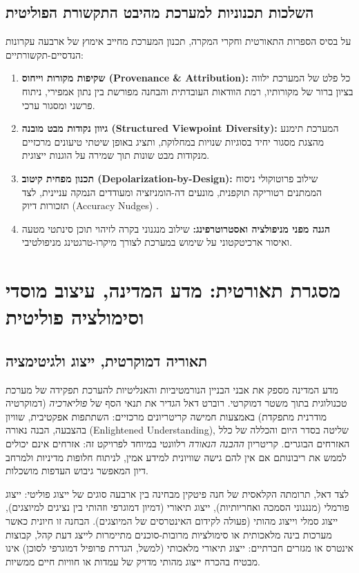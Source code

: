 \subsection{השלכות תכנוניות למערכת מהיבט התקשורת הפוליטית}
על בסיס הספרות התאורטית וחקרי המקרה, תכנון המערכת מחייב אימוץ של ארבעה עקרונות הנדסיים-תקשורתיים:
\begin{enumerate}
    \item \textbf{שקיפות מקורות וייחוס (Provenance \& Attribution):} כל פלט של המערכת ילווה בציון ברור של מקורותיו, רמת הוודאות העובדתית והבחנה מפורשת בין נתון אמפירי, ניתוח פרשני ומסגור ערכי.
    \item \textbf{גיוון נקודות מבט מובנה (Structured Viewpoint Diversity):} המערכת תימנע מהצגת מסגור יחיד בסוגיות שנויות במחלוקת, ותציג באופן שיטתי טיעונים מרכזיים מנקודות מבט שונות תוך שמירה על הוגנות ייצוגית.
    \item \textbf{תכנון מפחית קיטוב (Depolarization-by-Design):} שילוב פרוטוקולי ניסוח הממתנים רטוריקה תוקפנית, מונעים דה-הומניזציה ומעודדים הנמקה עניינית, לצד תזכורות דיוק (Accuracy Nudges) \cite{pennycook2021shifting}.
    \item \textbf{הגנה מפני מניפולציה ואסטרוטרפינג:} שילוב מנגנוני בקרה לזיהוי תוכן סינתטי מטעה ואיסור ארכיטקטוני על שימוש במערכת לצורך מיקרו-טרגטינג מניפולטיבי.
\end{enumerate}

\section{מסגרת תאורטית: מדע המדינה, עיצוב מוסדי וסימולציה פוליטית}
\label{sec:political-science}

\subsection{תאוריה דמוקרטית, ייצוג ולגיטימציה}
מדע המדינה מספק את אבני הבניין הנורמטיביות והאנליטיות להערכת תפקידה של מערכת טכנולוגית בתוך משטר דמוקרטי. רוברט דאל \cite{dahl1989democracy} הגדיר את תנאי הסף של \emph{פוליארכיה} (דמוקרטיה מודרנית מתפקדת) באמצעות חמישה קריטריונים מרכזיים: השתתפות אפקטיבית, שוויון בהצבעה, הבנה נאורה (Enlightened Understanding), שליטה בסדר היום והכללה של כלל האזרחים הבוגרים. קריטריון \emph{ההבנה הנאורה} רלוונטי במיוחד לפרויקט זה: אזרחים אינם יכולים לממש את ריבונותם אם אין להם גישה שוויונית למידע אמין, לניתוח חלופות מדיניות ולמרחב דיון המאפשר גיבוש העדפות מושכלות.

לצד דאל, תרומתה הקלאסית של חנה פיטקין \cite{pitkin1967concept} מבחינה בין ארבעה סוגים של ייצוג פוליטי: ייצוג פורמלי (מנגנוני הסמכה ואחריותיות), ייצוג תיאורי (דמיון דמוגרפי וזהותי בין נציגים למיוצגים), ייצוג סמלי וייצוג מהותי (פעולה לקידום האינטרסים של המיוצגים). הבחנה זו חיונית כאשר מערכות בינה מלאכותית או סימולציות מרובות-סוכנים מתיימרות לייצג דעת קהל, קבוצות אינטרס או מגזרים חברתיים: ייצוג תיאורי מלאכותי (למשל, הגדרת פרופיל דמוגרפי לסוכן) אינו מבטיח בהכרח ייצוג מהותי מדויק של עמדות או חוויות חיים ממשיות.

